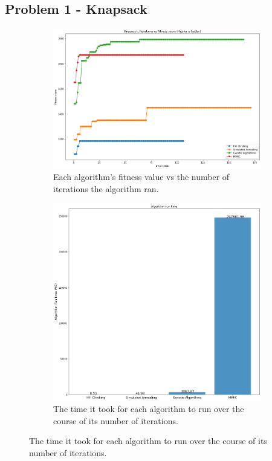 \documentclass[
letterpaper, %
]{IEEEtran}
\begin{document}
	\subsection{Problem 1 - Knapsack}
	\begin{figure}[h]
		\begin{subfigure}{.5\textwidth}
			\centering
			\includegraphics[width=.8\linewidth]{./images/exp1FitnessScore.png}
			\caption{Each algorithm's fitness value vs the number of iterations the algorithm ran.}
			\label{fig:exp1Score}
		\end{subfigure}
		\begin{subfigure}{.5\textwidth}
			\centering
			\includegraphics[width=.8\linewidth]{./images/exp1Runtime.png}
			\caption{The time it took for each algorithm to run over the course of its number of iterations.}
			\label{fig:exp1Runtime}
		\end{subfigure}
	\end{figure}
\end{document}
